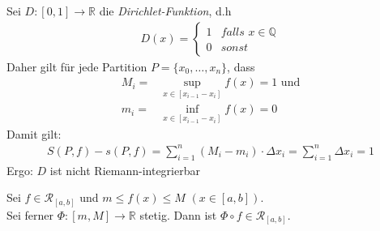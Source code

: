 \begin{Beispiel}{
	Sei $D:[0,1] \rightarrow \mathbb{R}$ die \emph{Dirichlet-Funktion}, d.h
	\begin{align*}
		D(x) = \begin{cases}
			1 & \textit{falls } x \in \mathbb{Q} \\
			0 & sonst
		\end{cases}
	\end{align*}
	Daher gilt für jede Partition $P = \{x_0, \hdots, x_n\}$, dass 
	\begin{align*}
		M_i = & \sup_{x \in [x_{i-1}-x_i]} f(x) = 1 \text{ und}\\
		m_i = & \inf_{x \in [x_{i-1}-x_i]} f(x) = 0
	\end{align*}
	Damit gilt:
	\begin{align*}
		S(P,f) - s(P,f) = \sum_{i = 1}^n (M_i - m_i) \cdot \Delta x_i 
		= \sum_{i = 1}^n \Delta x_i = 1
	\end{align*}
	Ergo: $D$ ist nicht Riemann-integrierbar
}\end{Beispiel}

\begin{Satz}{\label{vl_11_satz23}
	Sei $f \in \mathcal{R}_{[a,b]}$ und $m \leq f(x) \leq M$ $ (x \in [a,b])$.\\
	Sei ferner $\Phi : [m, M] \rightarrow \mathbb{R}$ stetig. 
	Dann ist $\Phi \circ f \in \mathcal{R}_{[a,b]}$.
}\end{Satz}

